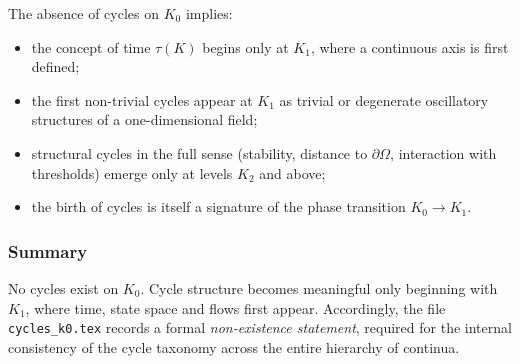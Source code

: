 The absence of cycles on $K_0$ implies:
\begin{itemize}
  \item the concept of time $\tau(K)$ begins only at $K_1$, where a
        continuous axis is first defined;
  \item the first non-trivial cycles appear at $K_1$ as trivial or
        degenerate oscillatory structures of a one-dimensional field;
  \item structural cycles in the full sense (stability, distance to
        $\partial\Omega$, interaction with thresholds) emerge only at
        levels $K_2$ and above;
  \item the birth of cycles is itself a signature of the phase
        transition $K_0\to K_1$.
\end{itemize}

\subsubsection{Summary}

No cycles exist on $K_0$.
Cycle structure becomes meaningful only beginning with $K_1$, where time,
state space and flows first appear.
Accordingly, the file \texttt{cycles\_k0.tex} records a formal
\emph{non-existence statement}, required for the internal consistency
of the cycle taxonomy across the entire hierarchy of continua.
